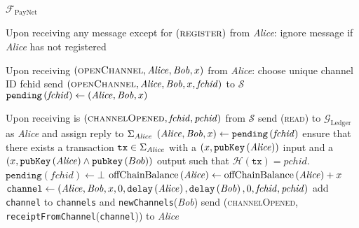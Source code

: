 \begin{functionality}{$\mathcal{F}_{\mathrm{PayNet}}$}
\begin{algorithmic}[1]
    \State Upon receiving any message except for
    $\left(\textsc{register}\right)$ from \textit{Alice}:
    \Indent
      \State ignore message if \textit{Alice} has not registered
    \EndIndent
    \State

    \State Upon receiving $\left(\textsc{openChannel}, \mathit{Alice}, \mathit{Bob}, x\right)$
    from \textit{Alice}:
    \Indent
      \State choose unique channel ID fchid
      \State send $\left(\textsc{openChannel}, \mathit{Alice}, \mathit{Bob}, x,
      \mathit{fchid}\right)$ to $\mathcal{S}$
      \State $\mathtt{pending}\left(\mathit{fchid}\right) \gets \left(\mathit{Alice},
      \mathit{Bob}, x\right)$
    \EndIndent
    \State

    \State Upon receiving is $\left(\textsc{channelOpened}, \mathit{fchid},
    \mathit{pchid}\right)$ from $\mathcal{S}$
    \Indent
      \State send (\textsc{read}) to $\mathcal{G}_{\mathrm{Ledger}}$ as
      \textit{Alice} and assign reply to $\Sigma_{\mathit{Alice}}$
      \State $\left(\mathit{Alice}, \mathit{Bob}, x\right) \gets
      \mathtt{pending}\left(\mathit{fchid}\right)$
      \State ensure that there exists a transaction $\mathtt{tx} \in
      \Sigma_{\mathit{Alice}}$ with a $\left(x,
      \mathtt{pubKey}\left(\mathit{Alice}\right)\right)$ input and a $\left(x,
      \mathtt{pubKey}\left(\mathit{Alice}\right) \wedge
      \mathtt{pubkey}\left(Bob\right)\right)$ output such that
      $\mathcal{H}\left(\mathtt{tx}\right) = \mathit{pchid}$. 
      \State $\mathtt{pending}\left(\mathit{fchid}\right) \gets \bot$
      \State $\mathrm{offChainBalance}\left(\mathit{Alice}\right) \gets
      \mathrm{offChainBalance}\left(\mathit{Alice}\right) + x$ 
      \State $\mathtt{channel} \gets \left(\mathit{Alice}, \mathit{Bob}, x, 0,
      \mathtt{delay}\left(\mathit{Alice}\right), \mathtt{delay}\left(\mathit{Bob}\right), 0,
      \mathit{fchid}, \mathit{pchid}\right)$
      \State add \texttt{channel} to \texttt{channels} and
      \texttt{newChannels}(\textit{Bob})
      \State send (\textsc{channelOpened},
      \texttt{receiptFromChannel}(\texttt{channel})) to \textit{Alice}
    \EndIndent
    \State


\end{algorithmic}
\end{functionality}
